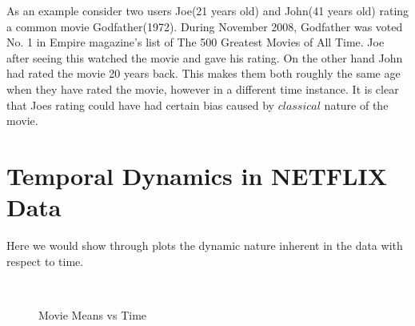 \begin{example}
 As an example consider two users Joe(21 years old) and John(41 years old)
rating a common movie Godfather(1972). During November 2008, Godfather was voted
No. 1 in Empire magazine's list of The 500 Greatest Movies of All Time. Joe
after seeing this watched the movie and gave his rating. On the other hand John
had rated the movie 20 years back. This makes them both roughly the same age
when they have rated the movie, however in a different time instance. It is
clear that Joes rating could have had certain bias caused by $classical$ nature
of the movie.
\end{example}

\section{Temporal Dynamics in NETFLIX Data}
Here we would show through plots the dynamic nature inherent in the data with
respect to time. 


\begin{figure}[h]
\centering
{}
\\

\label{fig:MovieMean_temporal}
\caption{Movie Means vs Time}
\end{figure}




